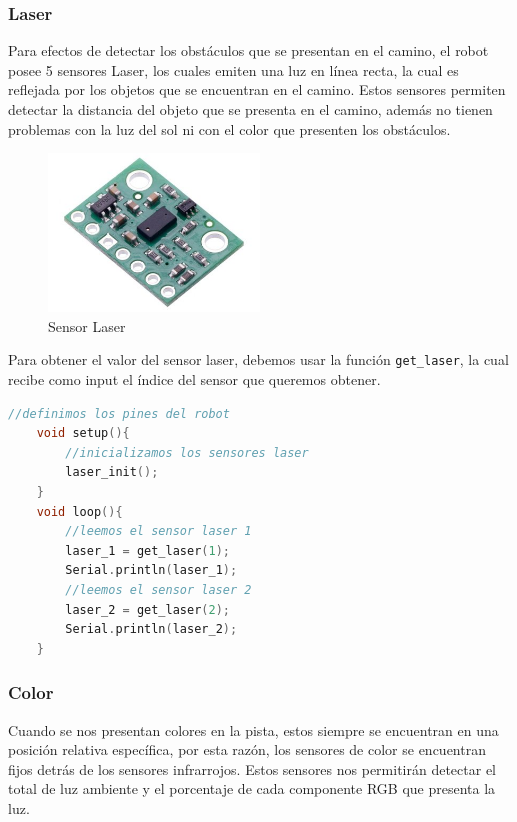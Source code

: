 \documentclass[12pt]{article}
\begin{document}
\subsubsection*{\textcolor{subsubsectioncolor}{Laser}}
Para efectos de detectar los obstáculos que se presentan en el camino, el robot posee 5 sensores Laser, los cuales
emiten una luz en línea recta, la cual es reflejada por los objetos que se encuentran en el camino. Estos sensores permiten
detectar la distancia del objeto que se presenta en el camino, además no tienen problemas con la luz del sol ni con el color
que presenten los obstáculos.

\begin{figure}[H]
    \centering
    \includegraphics[width=0.5\textwidth]{sensor_images/laser.jpeg}
    \caption{Sensor Laser}
    \label{fig:sensor_laser}
\end{figure}

Para obtener el valor del sensor laser, debemos usar la función \texttt{get\_laser}, la cual recibe como input el índice del sensor que queremos obtener.

\begin{lstlisting}[language=C++, basicstyle=\color{codecolor}]
    //definimos los pines del robot
    void setup(){
        //inicializamos los sensores laser
        laser_init();
    }
    void loop(){
        //leemos el sensor laser 1
        laser_1 = get_laser(1);
        Serial.println(laser_1);
        //leemos el sensor laser 2
        laser_2 = get_laser(2);
        Serial.println(laser_2);
    }
\end{lstlisting}

\subsubsection*{\textcolor{subsubsectioncolor}{Color}}
Cuando se nos presentan colores en la pista, estos siempre se encuentran en una posición relativa específica, por esta razón, los sensores de color
se encuentran fijos detrás de los sensores infrarrojos. Estos sensores nos permitirán detectar el total de luz ambiente y el porcentaje de cada componente
RGB que presenta la luz.
\end{document}
